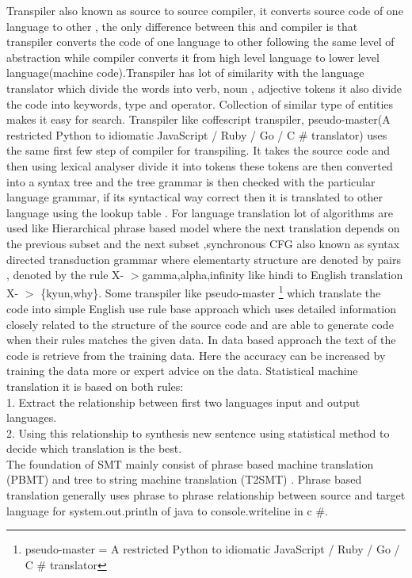 \documentclass[23pt]{article}
\begin{document}
{\Large Transpiler also known as source to source compiler, it converts source code of one language to other , the only difference between this and compiler is that transpiler converts the code of one language to other following the same level of abstraction while compiler converts it from high level language to lower level language(machine code).Transpiler has lot of similarity with the language translator which divide the words into verb, noun , adjective tokens it also divide the code into keywords, type and operator. Collection of similar type of entities makes it easy for search.
Transpiler like coffescript transpiler, pseudo-master(A restricted Python to idiomatic JavaScript / Ruby / Go / C \# translator)  uses the same first few step of compiler for transpiling. It takes the source code and then using lexical analyser divide it into tokens these tokens are then converted into a syntax tree and the tree grammar is then checked with the particular language grammar, if its syntactical way correct then it is translated to other language using the lookup table \cite{pseudo} \cite{coffeescript}. For language translation lot of algorithms are used like Hierarchical phrase based model where the next translation depends on the previous subset and the next subset ,synchronous CFG also known as syntax directed transduction grammar where elementarty structure are denoted by pairs , denoted by the rule X- $>${gamma,alpha,infinity} like hindi to English translation X- $>$ \{kyun,why\}\cite{ph1}. Some transpiler like pseudo-master \footnote{ pseudo-master = A restricted Python to idiomatic JavaScript / Ruby / Go / C \# translator } which translate the code into simple English use rule base approach which uses detailed information closely related to the structure of the source code and are able to generate code when their rules matches the given data. In data based approach the text of the code is retrieve from the training data. Here the accuracy can be increased by training the data more or expert advice on the data. Statistical machine translation it is based on both rules: \\ 1.	 Extract the relationship between first two languages input and output languages. \\
2. Using this relationship to synthesis new sentence using statistical method to decide which translation is the best. \\
The foundation of SMT mainly consist of phrase based machine translation (PBMT) and tree to string machine translation (T2SMT) \cite{pbmt}. Phrase based translation generally uses phrase to phrase relationship between source and target language for system.out.println of java to console.writeline in c \#.
}
\end{document}
